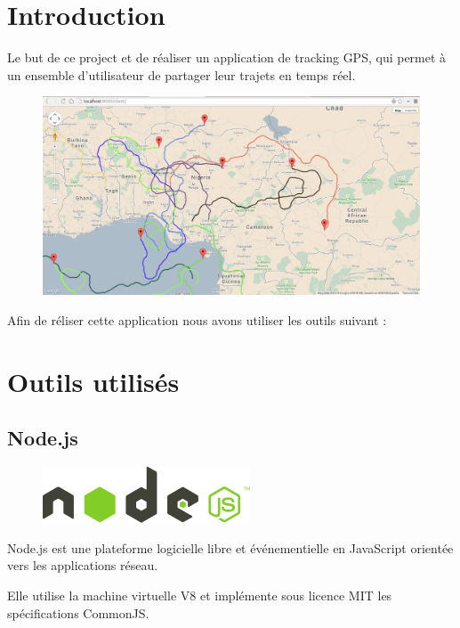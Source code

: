 \documentclass[a4paper]{article}
\begin{document}
\section{Introduction}
Le but de ce project et de réaliser un application de tracking GPS, qui 
permet à un ensemble d'utilisateur de partager leur trajets en temps réel.

\begin{figure}[H]
  \begin{center}
  \includegraphics[scale=0.25]{screenshot.png}
  \end{center}
\end{figure}

Afin de réliser cette application nous avons utiliser les outils suivant :

\section{Outils utilisés}
\subsection{Node.js}

\begin{figure}[H]
  \begin{center}
  \includegraphics[scale=0.5]{nodejs.png}
  \end{center}
\end{figure}

Node.js est une plateforme logicielle libre et événementielle en 
JavaScript orientée vers les applications réseau.

Elle utilise la machine virtuelle V8 et implémente sous 
licence MIT les spécifications CommonJS. 
\end{document}
